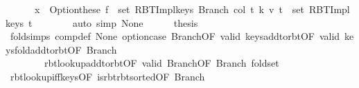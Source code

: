 \begin{isabellebody}
\ \ \ \ \ \ x\ {\isasymin}\ Option{\isachardot}{\kern0pt}these\ {\isacharparenleft}{\kern0pt}f\ {\isacharbackquote}{\kern0pt}\ set\ {\isacharparenleft}{\kern0pt}RBT{\isacharunderscore}{\kern0pt}Impl{\isachardot}{\kern0pt}keys\ {\isacharparenleft}{\kern0pt}Branch\ col\ t{}\ k\ v\ t{}{\isacharparenright}{\kern0pt}{\isacharparenright}{\kern0pt}{\isacharparenright}{\kern0pt}\ {\isasymunion}\ set\ {\isacharparenleft}{\kern0pt}RBT{\isacharunderscore}{\kern0pt}Impl{\isachardot}{\kern0pt}keys\ t{\isacharprime}{\kern0pt}{\isacharparenright}{\kern0pt}{\isachardoublequoteclose}\isanewline
\ \ \ \ \ \ \isamarkupfalse%
\ {\isacharparenleft}{\kern0pt}auto\ simp{\isacharcolon}{\kern0pt}\ None{\isacharparenright}{\kern0pt}\isanewline
\ \ \ \ \isamarkupfalse%
\ {\isacharquery}{\kern0pt}thesis\isanewline
\ \ \ \ \ \ \isamarkupfalse%
\ fold{\isacharunderscore}{\kern0pt}simps\ comp{\isacharunderscore}{\kern0pt}def\ None\ option{\isachardot}{\kern0pt}case{\isacharparenleft}{\kern0pt}{}{\isacharparenright}{\kern0pt}\ Branch{\isacharparenleft}{\kern0pt}{}{\isacharparenright}{\kern0pt}{\isacharbrackleft}{\kern0pt}OF\ valid{\isacharbrackright}{\kern0pt}\ keys{\isacharunderscore}{\kern0pt}add{\isacharunderscore}{\kern0pt}to{\isacharunderscore}{\kern0pt}rbt{\isacharbrackleft}{\kern0pt}OF\ valid{\isacharbrackright}{\kern0pt}\ keys{\isacharunderscore}{\kern0pt}fold{\isacharunderscore}{\kern0pt}add{\isacharunderscore}{\kern0pt}to{\isacharunderscore}{\kern0pt}rbt{\isacharbrackleft}{\kern0pt}OF\ Branch{\isacharparenleft}{\kern0pt}{}{\isacharparenright}{\kern0pt}{\isacharbrackright}{\kern0pt}\isanewline
\ \ \ \ \ \ \ \ rbt{\isacharunderscore}{\kern0pt}lookup{\isacharunderscore}{\kern0pt}add{\isacharunderscore}{\kern0pt}to{\isacharunderscore}{\kern0pt}rbt{\isacharbrackleft}{\kern0pt}OF\ valid{\isacharbrackright}{\kern0pt}\ Branch{\isacharparenleft}{\kern0pt}{}{\isacharparenright}{\kern0pt}{\isacharbrackleft}{\kern0pt}OF\ Branch{\isacharparenleft}{\kern0pt}{}{\isacharparenright}{\kern0pt}{\isacharbrackright}{\kern0pt}\ fold{\isacharunderscore}{\kern0pt}set\isanewline
\ \ \ \ \ \ \isamarkupfalse%
\ rbt{\isacharunderscore}{\kern0pt}lookup{\isacharunderscore}{\kern0pt}iff{\isacharunderscore}{\kern0pt}keys{\isacharparenleft}{\kern0pt}{}{\isacharcomma}{\kern0pt}{}{\isacharparenright}{\kern0pt}{\isacharbrackleft}{\kern0pt}OF\ is{\isacharunderscore}{\kern0pt}rbt{\isacharunderscore}{\kern0pt}rbt{\isacharunderscore}{\kern0pt}sorted{\isacharbrackleft}{\kern0pt}OF\ Branch{\isacharparenleft}{\kern0pt}{}{\isacharparenright}{\kern0pt}{\isacharbrackright}{\kern0pt}{\isacharbrackright}{\kern0pt}\isanewline

\end{isabellebody}
